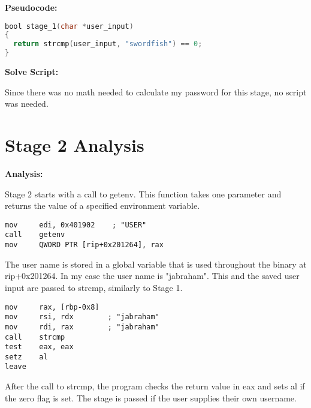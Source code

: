 \documentclass{article}
\begin{document}
\begin{flushleft}
\textbf{Pseudocode:}
\vspace{.5pc}
\end{flushleft}
\begin{lstlisting}[language=C]
bool stage_1(char *user_input)
{
  return strcmp(user_input, "swordfish") == 0;
}
\end{lstlisting}

\begin{flushleft}
\textbf{Solve Script:}
\vspace{.5pc}
\end{flushleft}
\par
Since there was no math needed to calculate my password for this stage, no 
script was needed.

\newpage
\section{Stage 2 Analysis}
\begin{flushleft}
\vspace{.5pc}
\end{flushleft}

\begin{flushleft}
\textbf{Analysis:}
\vspace{.5pc}
\end{flushleft}

\par
Stage 2 starts with a call to getenv.  This function takes one parameter and 
returns the value of a specified environment variable.
\begin{lstlisting}
mov     edi, 0x401902    ; "USER"
call    getenv
mov     QWORD PTR [rip+0x201264], rax
\end{lstlisting}
\par
The user name is stored in a global variable that is used throughout the 
binary at rip+0x201264.  In my case the user name is "jabraham".  This and the 
saved user input are passed to strcmp, similarly to Stage 1.
\begin{lstlisting}
mov     rax, [rbp-0x8]
mov     rsi, rdx        ; "jabraham"
mov     rdi, rax        ; "jabraham"
call    strcmp
test    eax, eax
setz    al
leave
\end{lstlisting}
\par
After the call to strcmp, the program checks the return value in eax and sets 
al if the zero flag is set.  The stage is passed if the user supplies their 
own username.
\end{document}
